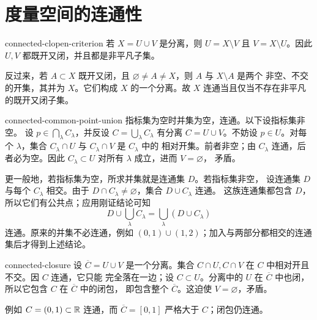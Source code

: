 \chapter{度量空间的连通性}
\label{chap:metric-connectedness-solutions}

\begin{solution}{connected-clopen-criterion}
若 \(X=U\cup V\) 是分离，则 \(U=X\setminus V\) 且
\(V=X\setminus U\)。因此 \(U,V\) 都既开又闭，并且都是非平凡子集。

反过来，若 \(A\subset X\) 既开又闭，且
\(\varnothing\ne A\ne X\)，则 \(A\) 与 \(X\setminus A\) 是两个
非空、不交的开集，其并为 \(X\)。它们构成 \(X\) 的一个分离。故
\(X\) 连通当且仅当不存在非平凡的既开又闭子集。
\end{solution}

\begin{solution}{connected-common-point-union}
指标集为空时并集为空，连通。以下设指标集非空。
设 \(p\in\bigcap_{\lambda}C_\lambda\)，并反设
\(C=\bigcup_\lambda C_\lambda\) 有分离 \(C=U\cup V\)。不妨设
\(p\in U\)。对每个 \(\lambda\)，集合
\(C_\lambda\cap U\) 与 \(C_\lambda\cap V\) 是 \(C_\lambda\) 中的
相对开集。前者非空；由 \(C_\lambda\) 连通，后者必为空。因此
\(C_\lambda\subset U\) 对所有 \(\lambda\) 成立，进而 \(V=\varnothing\)，
矛盾。

更一般地，若指标集为空，所求并集就是连通集 \(D\)。若指标集非空，
设连通集 \(D\) 与每个 \(C_\lambda\) 相交。由于
\(D\cap C_\lambda\ne\varnothing\)，集合 \(D\cup C_\lambda\) 连通。
这族连通集都包含 \(D\)，所以它们有公共点；应用刚证结论可知
\[
 D\cup\bigcup_\lambda C_\lambda
   =\bigcup_\lambda(D\cup C_\lambda)
\]
连通。原来的并集不必连通，例如
\((0,1)\cup(1,2)\)；加入与两部分都相交的连通集后才得到上述结论。
\end{solution}

\begin{solution}{connected-closure}
设 \(\overline C=U\cup V\) 是一个分离。集合
\(C\cap U,C\cap V\) 在 \(C\) 中相对开且不交。因 \(C\) 连通，它只能
完全落在一边；设 \(C\subset U\)。分离中的 \(U\) 在
\(\overline C\) 中也闭，所以它包含 \(C\) 在 \(\overline C\) 中的闭包，
即包含整个 \(\overline C\)。这迫使 \(V=\varnothing\)，矛盾。

例如 \(C=(0,1)\subset\mathbb{R}\) 连通，而
\(\overline C=[0,1]\) 严格大于 \(C\)；闭包仍连通。
\end{solution}

